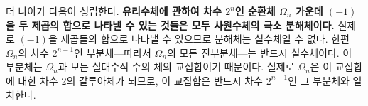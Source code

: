\documentclass[11pt]{article}
\providecommand{\srcspaced}[1]{\textbf{#1}}
\begin{document}
더 나아가 다음이 성립한다. \srcspaced{유리수체에 관하여 차수 $2^n$인 순환체 $\Omega_n$ 가운데 $(-1)$을 두 제곱의 합으로 나타낼 수 있는 것들은 모두 사원수체의 극소 분해체이다.} 실제로 $(-1)$을 제곱들의 합으로 나타낼 수 있으므로 분해체는 실수체일 수 없다. 한편 $\Omega_n$의 차수 $2^{n-1}$인 부분체---따라서 $\Omega_n$의 모든 진부분체---는 반드시 실수체이다. 이 부분체는 $\Omega_n$과 모든 실대수적 수의 체의 교집합이기 때문이다. 실제로 $\Omega_n$은 이 교집합에 대한 차수 2의 갈루아체가 되므로, 이 교집합은 반드시 차수 $2^{n-1}$인 그 부분체와 일치한다.
\end{document}

